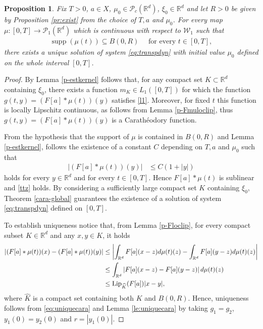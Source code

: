 \documentclass[A4paper,11pt]{article}
\newtheorem{proposition}[theorem]{Proposition}
\theoremstyle{definition}
\newcommand{\Lip}{\textup{Lip}}
\newcommand{\loc}{\textup{loc}}
\newcommand{\R}{\mathbb{R}}
\newcommand{\W}{\mathcal{W}}
\newcommand{\PP}{\mathcal{P}_1}
\DeclareMathOperator{\supp}{supp}
\begin{document}
\begin{proposition}
Fix $T > 0$, $a \in X$, $\mu_0 \in \mathcal{P}_c(\R^d)$, $\xi_0 \in \R^d$ and let $R > 0$ be given by Proposition \ref{pr:exist} from the choice of $T, a$ and $\mu_0$. For every map $\mu:[0,T] \rightarrow \PP(\R^d)$ which is continuous with respect to $\W_1$ such that
\begin{align*}
\supp(\mu(t)) \subseteq B(0,R) \quad \text{ for every } t \in [0,T],
\end{align*}
there exists a unique solution of system \eqref{eq:transpdyn} with initial value $\mu_0$ defined on the whole interval $[0,T]$.
\end{proposition}
\begin{proof}
By Lemma \ref{p-estkernel} follows that, for any compact set $K \subset \R^d$ containing $\xi_0$, there exists a function $m_K \in L_1([0,T])$ for which the function $g(t,y)=(F[a]\ast\mu(t))(y)$ satisfies \eqref{l1}. Moreover, for fixed $t$ this function is locally Lipschitz continuous, as follows from Lemma \ref{p-Fmuloclip}, thus $g(t,y)=(F[a]\ast\mu(t))(y)$ is a Carath\'eodory function.

		
From the hypothesis that the support of $\mu$ is contained in $B(0,R)$ and Lemma \ref{p-estkernel}, follows the existence of a constant $C$ depending on $T,a$ and $\mu_0$ such that
\begin{align*}
|(F[a]*\mu(t))(y)| &\leq C(1+|y|)
\end{align*}
holds for every $y \in \R^d$ and for every $t \in [0,T]$. Hence $F[a]*\mu(t)$ is sublinear and \eqref{ttz} holds. By considering a sufficiently large compact set $K$ containing $\xi_0$, Theorem \ref{cara-global} guarantees the existence of a solution of system \eqref{eq:transpdyn} defined on $[0,T]$.

To establish uniqueness notice that, from Lemma \ref{p-Floclip}, for every compact subset $K \in \R^d$ and any $x,y \in K$, it holds
\begin{align}
\begin{split}\label{eq:uniquecara}
|(F[a]*\mu(t))(x) - (F[a]*\mu(t))(y)| &\leq \left| \int_{\R^d}F[a](x-z)d\mu(t)(z) - \int_{\R^d}F[a](y-z)d\mu(t)(z)\right| \\
&\leq \int_{\R^d} \left|F[a](x-z) - F[a](y-z)\right|d\mu(t)(z) \\
&\leq \Lip_{\widehat{K}}(F[a]) |x-y|,
\end{split}\end{align}
where $\widehat{K}$ is a compact set containing both $K$ and $B(0,R)$. Hence, uniqueness follows from \eqref{eq:uniquecara} and Lemma \ref{le:uniquecara} by taking $g_1 = g_2$, $y_1(0) = y_2(0)$ and $r = |y_1(0)|$.
\end{proof}
\end{document}
